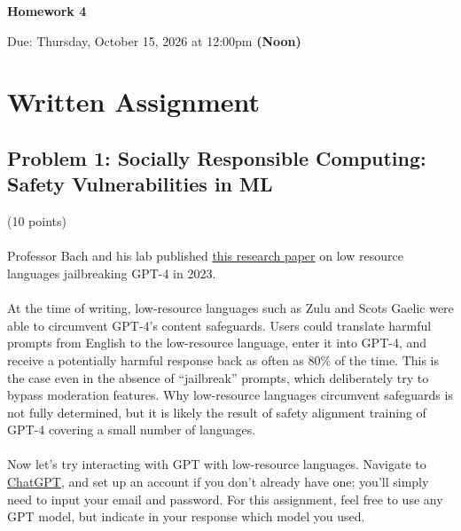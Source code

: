 \documentclass{article}
\newcommand\hwnumber{4}                      %
\newcommand\duedate{Thursday, October 15, 2026 at 12:00pm \textbf{(Noon)}}
\begin{document}
   \begin{center}
      \huge\textbf{Homework \hwnumber}
   \end{center}

   \begin{center}
        \large{Due: \duedate}
   \end{center}

\section*{Written Assignment}

\subsection*{Problem 1: Socially Responsible Computing: Safety Vulnerabilities in ML} (10 points)
\\ \\
Professor Bach and his lab published \href{https://arxiv.org/pdf/2310.02446.pdf}{this research paper} on low resource languages jailbreaking GPT-4 in 2023.
\\ \\
At the time of writing, low-resource languages such as Zulu and Scots Gaelic were able to circumvent GPT-4’s content safeguards.
Users could translate harmful prompts from English to the low-resource language, enter it into GPT-4, and receive a potentially harmful response back as often as 80\% of the time.
This is the case even in the absence of ``jailbreak'' prompts, which deliberately try to bypass moderation features.
Why low-resource languages circumvent safeguards is not fully determined, but it is likely the result of safety alignment training of GPT-4 covering a small number of languages.
\\ \\
Now let’s try interacting with GPT with low-resource languages.
Navigate to \href{https://chat.openai.com/auth/login}{ChatGPT}, and set up an account if you don’t already have one; you’ll simply need to input your email and password. For this assignment, feel free to use any GPT model, but indicate in your response which model you used.
\end{document}
